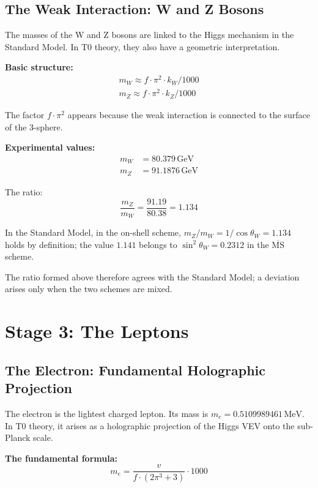 	\subsection{The Weak Interaction: W and Z Bosons}
	
	The masses of the W and Z bosons are linked to the Higgs mechanism in the Standard Model. In T0 theory, they also have a geometric interpretation.
	
	\textbf{Basic structure:}
	\begin{align}
		\boxed{m_W \approx f \cdot \pi^2 \cdot k_W / 1000} \\
		\boxed{m_Z \approx f \cdot \pi^2 \cdot k_Z / 1000}
	\end{align}
	
	The factor \(f \cdot \pi^2\) appears because the weak interaction is connected to the surface of the 3-sphere.
	
	\textbf{Experimental values:}
	\begin{align}
		m_W &= 80.379\,\text{GeV} \\
		m_Z &= 91.1876\,\text{GeV}
	\end{align}
	
	The ratio:
	\begin{equation}
		\frac{m_Z}{m_W} = \frac{91.19}{80.38} = 1.134
	\end{equation}
	
	In the Standard Model, in the on-shell scheme, \(m_Z/m_W = 1/\cos\theta_W = 1.134\) holds by definition; the value \(1.141\) belongs to \(\sin^2\theta_W = 0.2312\) in the \(\overline{\text{MS}}\) scheme.
	
	The ratio formed above therefore agrees with the Standard Model; a deviation arises only when the two schemes are mixed.
	
	\section{Stage 3: The Leptons}
	
	\subsection{The Electron: Fundamental Holographic Projection}
	
	The electron is the lightest charged lepton. Its mass is \(m_e = 0.5109989461\,\text{MeV}\). In T0 theory, it arises as a holographic projection of the Higgs VEV onto the sub-Planck scale.
	
	\textbf{The fundamental formula:}
	\begin{equation}
		\boxed{m_e = \frac{v}{f \cdot (2\pi^3 + 3)} \cdot 1000}
	\end{equation}
	
